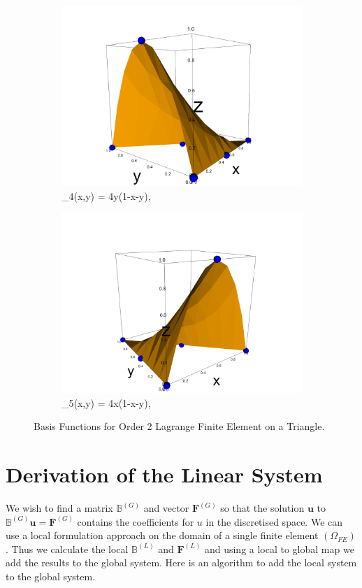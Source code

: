 \documentclass[12pt]{ociamthesis}
\begin{document}
\begin{figure}[H]
\begin{subfigure}{0.5\textwidth}
     \includegraphics[width=\textwidth]{Pics/BasisFunc/triBasis4.png}
     \caption{\phi_4(x,y) = 4y(1-x-y),}
 \end{subfigure}
 \hfill
 \begin{subfigure}{0.5\textwidth}
     \includegraphics[width=\textwidth]{Pics/BasisFunc/triBasis5.png}
     \caption{\phi_5(x,y) = 4x(1-x-y),}
 \end{subfigure}
 \hfill
 \caption{Basis Functions for Order 2 Lagrange Finite Element on a Triangle.} \label{triBasisFuncs}
\end{figure}

\section{Derivation of the Linear System}
We wish to find a matrix $\mathbb{B}^{(G)}$ and vector $\mathbf{F}^{(G)}$ so that the solution $\mathbf{u}$ to $\mathbb{B}^{(G)} \mathbf{u} = \mathbf{F}^{(G)}$ contains the coefficients for $u$ in the discretised space. We can use a local formulation approach on the domain of a single finite element $(\Omega_{FE})$. Thus we calculate the local $\mathbb{B}^{(L)}$ and $\mathbf{F}^{(L)}$ and using a local to global map we add the results to the global system. Here is an algorithm to add the local system to the global system.

\end{document}
